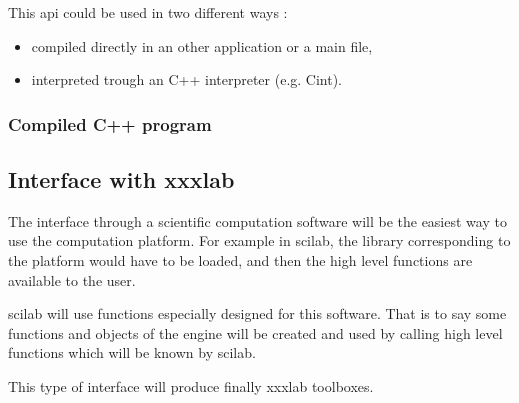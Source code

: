 This \ac{api} could be used in two different ways :
\begin{itemize}
\item compiled directly in an other application or a main file,
\item interpreted trough an C++ interpreter (e.g. Cint).
\end{itemize}


\subsubsection{Compiled C++ program}




\subsection{Interface with \acs{xxxlab}}
The interface through a scientific computation software will be the easiest way to use the computation platform. For example in
\ac{scilab}, the library corresponding to the platform would have to be loaded, and then the high level functions are available to the user.

\ac{scilab} will use functions especially designed for this software. That is to say some functions and objects of the \ac{engine} will
be created and used by calling high level functions which will be known by \ac{scilab}.

This type of interface will produce finally \ac{xxxlab} toolboxes.
